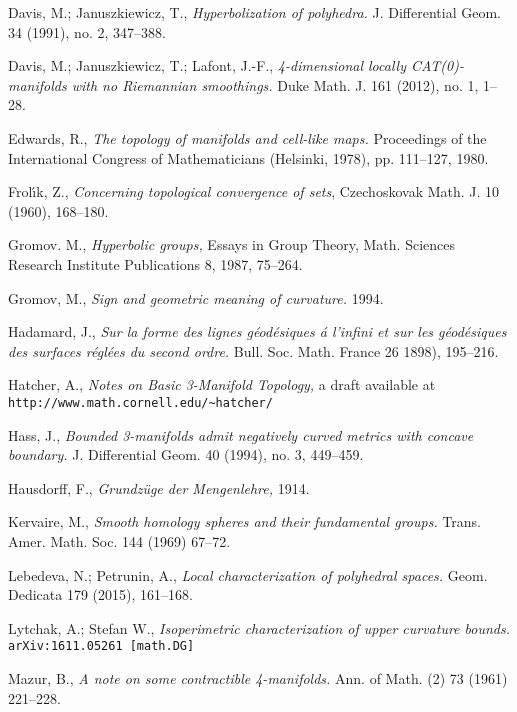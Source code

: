 \begin{thebibliography}{52}
Davis, M.; 
Januszkiewicz, T., 
\textit{Hyperbolization of polyhedra.} 
J. Differential Geom. 
34 
(1991), 
no. 2, 
347--388.

Davis, M.; 
Januszkiewicz, T.; 
Lafont, J.-F.,
\textit{4-dimensional locally CAT(0)-manifolds with no Riemannian smoothings.} 
Duke Math. J. 
161 
(2012), 
no. 1, 
1--28.

Edwards, R.,
\textit{The topology of manifolds and cell-like maps.} Proceedings of the International Congress of Mathematicians (Helsinki, 1978), pp. 111--127, 1980.

Frol\'{\i}k, Z., 
\textit{Concerning topological convergence of sets}, Czechoskovak Math. J. 
10 
(1960), 
168--180.

Gromov. M.,
\textit{Hyperbolic groups,} 
Essays in Group Theory,
Math. Sciences Research Institute Publications 8,
1987, 75--264.

Gromov, M.,
\textit{Sign and geometric meaning of curvature.}
1994.

Hadamard, J.,
\textit{Sur la forme des lignes g\'eod\'esiques \'a l'infini et sur les g\'eod\'esiques des surfaces r\'egl\'ees du second ordre.}
Bull. Soc. Math. France 
26 
1898), 
195--216.

Hatcher, A., 
\textit{Notes on Basic 3-Manifold Topology,}
a draft available at \verb+http://www.math.cornell.edu/~hatcher/+

Hass, J.,
\textit{Bounded 3-manifolds admit negatively curved metrics with concave boundary.}
J. Differential Geom. 
40 (1994), 
no. 3, 
449--459. 

Hausdorff, F., 
\textit{Grundz\"uge der Mengenlehre,} 
1914.

Kervaire, M., 
\textit{Smooth homology spheres and their fundamental groups.}
Trans. Amer. Math. Soc. 
144 
(1969) 
67--72.

Lebedeva, N.; 
Petrunin, A., 
\textit{Local characterization of polyhedral spaces.} Geom. Dedicata 179 (2015), 161--168.

Lytchak, A.; Stefan W.,
\textit{Isoperimetric characterization of upper curvature bounds.}
\texttt{arXiv:1611.05261 [math.DG]}

Mazur, B.,
\textit{A note on some contractible 4-manifolds.} 
Ann. of Math. (2) 
73 
(1961) 
221--228.


\end{thebibliography}

